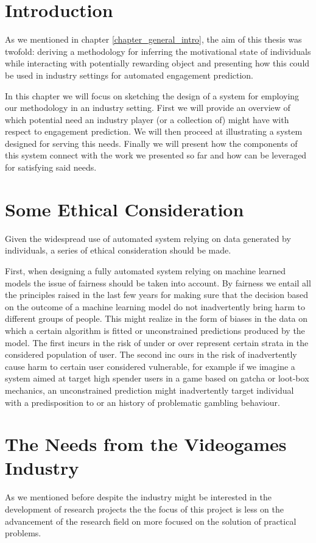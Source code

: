 \section{Introduction}
\label{industry_needs}
As we mentioned in chapter \ref{chapter_general_intro}, the aim of this thesis was twofold: deriving a methodology for inferring the motivational state of individuals while interacting with potentially rewarding object and presenting how this could be used in industry settings for automated engagement prediction.

In this chapter we will focus on sketching the design of a system for employing our methodology in an industry setting. First we will provide an overview of which potential need an industry player (or a collection of) might have with respect to engagement prediction. We will then proceed at illustrating a system designed for serving this needs. Finally we will present how the components of this system connect with the work we presented so far and how can be leveraged for satisfying said needs.

\section{Some Ethical Consideration}
\label{ehtical_considerations}
Given the widespread use of automated system relying on data generated by individuals, a series of ethical consideration should be made.

First, when designing a fully automated system relying on machine learned models the issue of fairness should be taken into account. By fairness we entail all the principles raised in the last few years for making sure that the decision based on the outcome of a machine learning model do not inadvertently bring harm to different groups of people. This might realize in the form of biases in the data on which a certain algorithm is fitted or unconstrained predictions produced by the model. The first incurs in the risk of  under or over represent certain strata in the considered population of user. The second inc ours in the risk of inadvertently cause harm to certain user considered vulnerable, for example if we imagine a system aimed at target high spender users in a game based on gatcha or loot-box mechanics, an unconstrained prediction might inadvertently target individual with a predisposition to or an history of problematic gambling behaviour.

\section{The Needs from the Videogames Industry}
\label{industry_needs}
As we mentioned before despite the industry might be interested in the development of research projects the the focus of this project is less on the advancement of the research field on more focused on the solution of practical problems. 

